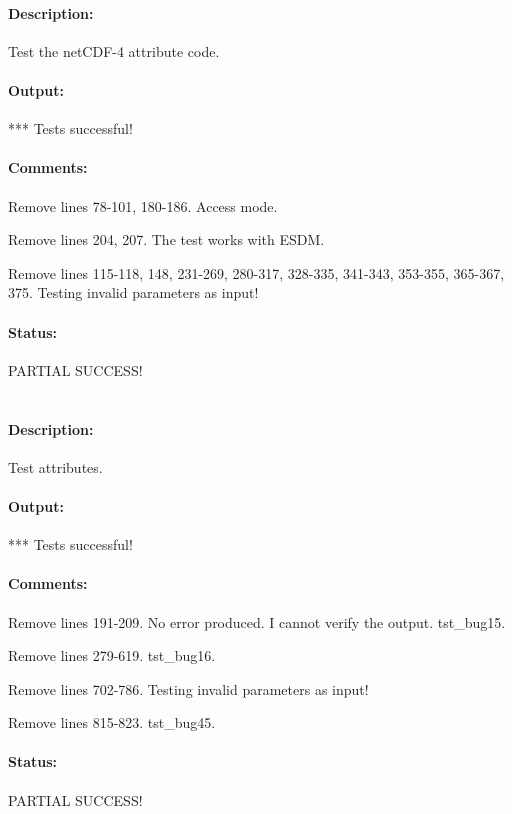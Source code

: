 \paragraph{Description:} Test the netCDF-4 attribute code.

\paragraph{Output:} *** Tests successful!

\paragraph{Comments:} Remove lines 78-101, 180-186. Access mode.

Remove lines 204, 207. The test works with ESDM.

Remove lines 115-118, 148, 231-269, 280-317, 328-335, 341-343, 353-355, 365-367, 375. Testing invalid parameters as input!

\paragraph{Status:} PARTIAL SUCCESS!

\section{}

\paragraph{Description:} Test attributes.

\paragraph{Output:} *** Tests successful!

\paragraph{Comments:} Remove lines 191-209. No error produced. I cannot verify the output. tst\_bug15.

Remove lines 279-619. tst\_bug16.

Remove lines 702-786. Testing invalid parameters as input!

Remove lines 815-823. tst\_bug45.

\paragraph{Status:} PARTIAL SUCCESS!


